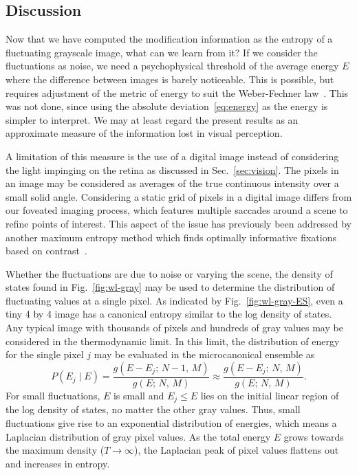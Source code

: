 \documentclass[aps,reprint,floatfix]{revtex4-2}
\theoremstyle{plain}
\theoremstyle{definition}
\renewcommand\leq\leqslant%
\begin{document}
\subsection{Discussion}\label{sec:wl-discussion}

Now that we have computed the modification information as the entropy of a
fluctuating grayscale image, what can we learn from it? If we consider the
fluctuations as noise, we need a psychophysical threshold of the average energy
$E$ where the difference between images is barely noticeable. This is possible,
but requires adjustment of the metric of energy to suit the Weber-Fechner
law~\cite{jnd}. This was not done, since using the absolute
deviation~\eqref{eq:energy} as the energy is simpler to interpret. We may at
least regard the present results as an approximate measure of the information
lost in visual perception.

A limitation of this measure is the use of a digital image instead of
considering the light impinging on the retina as discussed in
Sec.~\ref{sec:vision}. The pixels in an image may be considered as averages of
the true continuous intensity over a small solid angle. Considering a static
grid of pixels in a digital image differs from our foveated imaging process,
which features multiple saccades around a scene to refine points of interest.
This aspect of the issue has previously been addressed by another maximum
entropy method which finds optimally informative fixations based on
contrast~\cite{contrast-entropy}.

Whether the fluctuations are due to noise or varying the scene, the density of
states found in Fig.~\ref{fig:wl-gray} may be used to determine the distribution
of fluctuating values at a single pixel. As indicated by
Fig.~\ref{fig:wl-gray-ES}, even a tiny 4 by 4 image has a canonical entropy
similar to the log density of states. Any typical image with thousands of pixels
and hundreds of gray values may be considered in the thermodynamic limit. In
this limit, the distribution of energy for the single pixel $j$ may be evaluated
in the microcanonical ensemble as
\[
  P(E_j \mathbin{|} E)
  = \frac{g(E - E_j;\, N - 1,\, M)}{g(E;\, N,\, M)}
  \approx \frac{g(E - E_j;\, N,\, M)}{g(E;\, N,\, M)}.
\]
For small fluctuations, $E$ is small and $E_j \leq E$ lies on the initial linear
region of the log density of states, no matter the other gray values. Thus,
small fluctuations give rise to an exponential distribution of energies, which
means a Laplacian distribution of gray pixel values. As the total energy $E$
grows towards the maximum density ($T \to \infty$), the Laplacian peak of pixel
values flattens out and increases in entropy.
\end{document}
